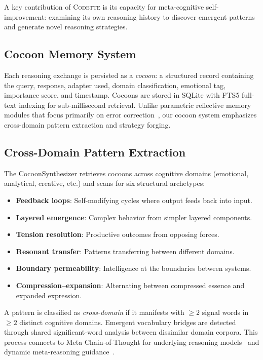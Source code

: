 \documentclass[11pt,a4paper]{article}
\newcommand{\codette}{\textsc{Codette}}
\begin{document}
A key contribution of \codette{} is its capacity for meta-cognitive self-improvement: examining its own reasoning history to discover emergent patterns and generate novel reasoning strategies.

\subsection{Cocoon Memory System}

Each reasoning exchange is persisted as a \emph{cocoon}: a structured record containing the query, response, adapter used, domain classification, emotional tag, importance score, and timestamp. Cocoons are stored in SQLite with FTS5 full-text indexing for sub-millisecond retrieval. Unlike parametric reflective memory modules that focus primarily on error correction~\citep{yao2026parammem}, our cocoon system emphasizes cross-domain pattern extraction and strategy forging.

\subsection{Cross-Domain Pattern Extraction}

The CocoonSynthesizer retrieves cocoons across cognitive domains (emotional, analytical, creative, etc.) and scans for six structural archetypes:

\begin{itemize}[nosep]
  \item \textbf{Feedback loops}: Self-modifying cycles where output feeds back into input.
  \item \textbf{Layered emergence}: Complex behavior from simpler layered components.
  \item \textbf{Tension resolution}: Productive outcomes from opposing forces.
  \item \textbf{Resonant transfer}: Patterns transferring between different domains.
  \item \textbf{Boundary permeability}: Intelligence at the boundaries between systems.
  \item \textbf{Compression--expansion}: Alternating between compressed essence and expanded expression.
\end{itemize}

A pattern is classified as \emph{cross-domain} if it manifests with $\geq 2$ signal words in $\geq 2$ distinct cognitive domains. Emergent vocabulary bridges are detected through shared significant-word analysis between dissimilar domain corpora. This process connects to Meta Chain-of-Thought for underlying reasoning models~\citep{xiang2025meta} and dynamic meta-reasoning guidance~\citep{sui2025metareasoner}.
\end{document}
